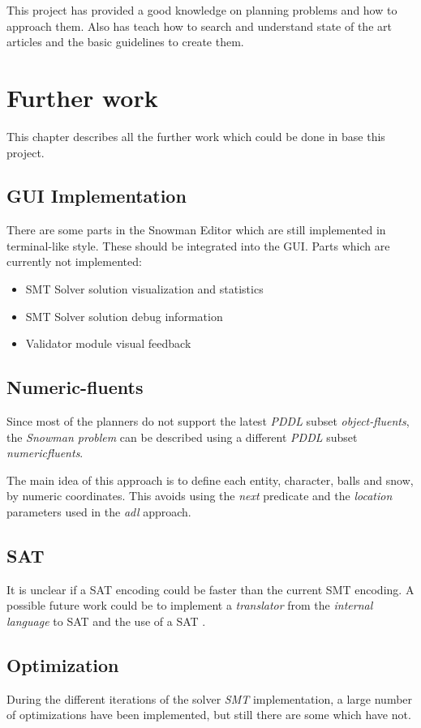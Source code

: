 \documentclass{report}
\theoremstyle{plain}
\begin{document}
\vspace{1\baselineskip}

This project has provided a good knowledge on planning problems and how to approach them. Also has teach how to search and understand state of the art articles and the basic  guidelines to create them.

\chapter{Further work}
This chapter describes all the further work which could be done in base this project.

\section{GUI Implementation}
There are some parts in the Snowman Editor which are still implemented in terminal-like style. These should be integrated into the GUI. Parts which are currently not implemented:
\begin{itemize}
    \item SMT Solver solution visualization and statistics
    \item SMT Solver solution debug information
    \item Validator module visual feedback
\end{itemize}

\section{Numeric-fluents}
Since most of the planners do not support the latest \emph{PDDL} subset \emph{object-fluents}, the \emph{Snowman problem} can be described using a different \emph{PDDL} subset \emph{numeric\-fluents}.

The main idea of this approach is to define each entity, character, balls and snow, by numeric coordinates. This avoids using the \emph{next} predicate and the \emph{location} parameters used in the \emph{adl} approach.

\section{SAT}
It is unclear if a SAT encoding could be faster than the current SMT encoding. A possible future work could be to implement a \emph{translator} from the \emph{internal language} to SAT and the use of a SAT .

\section{Optimization}
During the different iterations of the solver \emph{SMT} implementation, a large number of optimizations have been implemented, but still there are some which have not.
\end{document}
